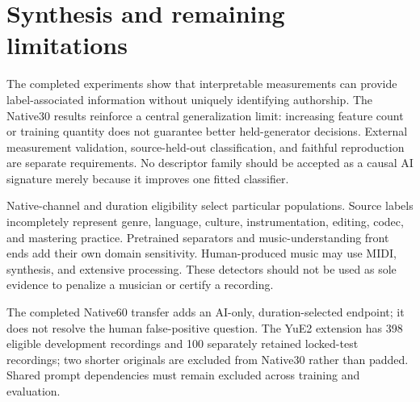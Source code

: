 \documentclass[11pt,a4paper]{article}
\begin{document}
\section{Synthesis and remaining limitations}
The completed experiments show that interpretable measurements can provide
label-associated information without uniquely identifying authorship. The
Native30 results reinforce a central generalization limit: increasing feature
count or training quantity does not guarantee better held-generator decisions.
External measurement validation, source-held-out classification, and faithful
reproduction are separate requirements. No descriptor family should be accepted
as a causal AI signature merely because it improves one fitted classifier.

Native-channel and duration eligibility select particular populations. Source
labels incompletely represent genre, language, culture, instrumentation, editing,
codec, and mastering practice. Pretrained separators and music-understanding
front ends add their own domain sensitivity. Human-produced music may use MIDI,
synthesis, and extensive processing. These detectors should not be used as sole
evidence to penalize a musician or certify a recording.

The completed Native60 transfer adds an AI-only, duration-selected endpoint;
it does not resolve the human false-positive question. The YuE2 extension has
398 eligible development recordings and 100 separately retained locked-test
recordings; two shorter originals are excluded from Native30 rather than padded.
Shared prompt dependencies must remain excluded across training and evaluation.




\end{document}
